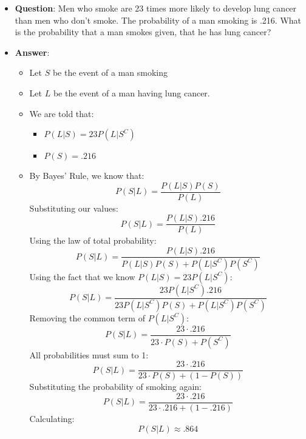\documentclass{article}
\begin{document}
\begin{itemize}
    \item \textbf{Question}: Men who smoke are 23 times more likely to develop lung cancer than men who don’t smoke. The probability of a man smoking is .216. What is the probability that a man smokes given, that he has lung cancer?

    \item \textbf{Answer}: 
    \begin{itemize}
        \item Let $S$ be the event of a man smoking
        \item Let $L$ be the event of a man having lung cancer.
        \item We are told that:
        \begin{itemize}
            \item $P(L | S) = 23P(L | S^C)$
            \item $P(S) = .216$
        \end{itemize}
        \item By Bayes' Rule, we know that:
        $$P(S | L) = \frac{P(L|S)P(S)}{P(L)}$$
        Substituting our values:
        $$P(S | L) = \frac{P(L|S).216}{P(L)}$$
        Using the law of total probability:
        $$P(S | L) = \frac{P(L|S).216}{P(L|S)P(S) + P(L|S^C)P(S^C)}$$
        Using the fact that we know $P(L | S) = 23P(L | S^C)$:
        $$P(S | L) = \frac{23P(L | S^C).216}{23P(L | S^C)P(S) + P(L|S^C)P(S^C)}$$
        Removing the common term of $P(L|S^C)$:
        $$P(S | L) = \frac{23 \cdot .216}{23 \cdot P(S) + P(S^C)}$$
        All probabilities must sum to 1:
        $$P(S | L) = \frac{23 \cdot .216}{23 \cdot P(S) + (1 - P(S))}$$
        Substituting the probability of smoking again:
        $$P(S | L) = \frac{23 \cdot .216}{23 \cdot .216 + (1 - .216)}$$
        Calculating:
        $$\boxed{P(S|L) \approx .864 }$$
    \end{itemize}
\end{itemize}

\section{}
\end{document}
